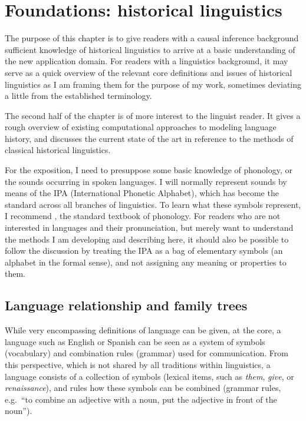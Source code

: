 \chapter{Foundations: historical linguistics}
The purpose of this chapter is to give readers with a causal inference background sufficient knowledge of historical linguistics to arrive at a basic understanding of the new application domain. For readers with a linguistics background, it may serve as a quick overview of the relevant core definitions and issues of historical linguistics as I am framing them for the purpose of my work, sometimes deviating a little from the established terminology.

The second half of the chapter is of more interest to the linguist reader. It gives a rough overview of existing computational approaches to modeling language history, and discusses the current state of the art in reference to the methods of classical historical linguistics.

For the exposition, I need to presuppose some basic knowledge of phonology, or the sounds occurring in spoken languages. I will normally represent sounds by means of the IPA (International Phonetic Alphabet), which has become the standard across all branches of linguistics. To learn what these symbols represent, I recommend \citet{ladefoged_maddieson_1996}, the standard textbook of phonology. For readers who are not interested in languages and their pronunciation, but merely want to understand the methods I am developing and describing here, it should also be possible to follow the discussion by treating the IPA as a bag of elementary symbols (an alphabet in the formal sense), and not assigning any meaning or properties to them.

\section{Language relationship and family trees}
While very encompassing definitions of language can be given, at the core, a language such as English or Spanish can be seen as a system of symbols (vocabulary) and combination rules (grammar) used for communication. From this perspective, which is not shared by all traditions within linguistics, a language consists of a collection of symbols (lexical items, such as \textit{them}, \textit{give}, or \textit{renaissance}), and rules how these symbols can be combined (grammar rules, e.g.\ ``to combine an adjective with a noun, put the adjective in front of the noun'').

